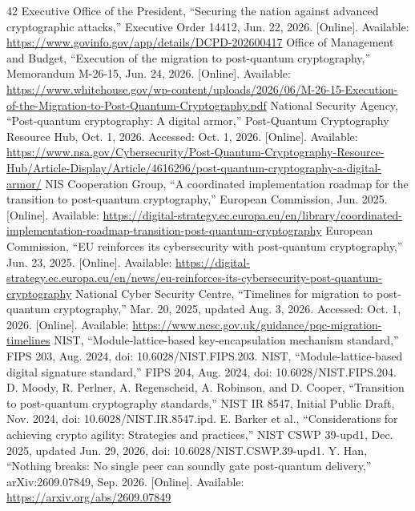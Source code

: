 \begin{thebibliography}{42}
Executive Office of the President, ``Securing the nation against advanced cryptographic attacks,'' Executive Order 14412, Jun. 22, 2026. [Online]. Available: \url{https://www.govinfo.gov/app/details/DCPD-202600417}
Office of Management and Budget, ``Execution of the migration to post-quantum cryptography,'' Memorandum M-26-15, Jun. 24, 2026. [Online]. Available: \url{https://www.whitehouse.gov/wp-content/uploads/2026/06/M-26-15-Execution-of-the-Migration-to-Post-Quantum-Cryptography.pdf}
National Security Agency, ``Post-quantum cryptography: A digital armor,'' Post-Quantum Cryptography Resource Hub, Oct. 1, 2026. Accessed: Oct. 1, 2026. [Online]. Available: \url{https://www.nsa.gov/Cybersecurity/Post-Quantum-Cryptography-Resource-Hub/Article-Display/Article/4616296/post-quantum-cryptography-a-digital-armor/}
NIS Cooperation Group, ``A coordinated implementation roadmap for the transition to post-quantum cryptography,'' European Commission, Jun. 2025. [Online]. Available: \url{https://digital-strategy.ec.europa.eu/en/library/coordinated-implementation-roadmap-transition-post-quantum-cryptography}
European Commission, ``EU reinforces its cybersecurity with post-quantum cryptography,'' Jun. 23, 2025. [Online]. Available: \url{https://digital-strategy.ec.europa.eu/en/news/eu-reinforces-its-cybersecurity-post-quantum-cryptography}
National Cyber Security Centre, ``Timelines for migration to post-quantum cryptography,'' Mar. 20, 2025, updated Aug. 3, 2026. Accessed: Oct. 1, 2026. [Online]. Available: \url{https://www.ncsc.gov.uk/guidance/pqc-migration-timelines}
NIST, ``Module-lattice-based key-encapsulation mechanism standard,'' FIPS 203, Aug. 2024, doi: 10.6028/NIST.FIPS.203.
NIST, ``Module-lattice-based digital signature standard,'' FIPS 204, Aug. 2024, doi: 10.6028/NIST.FIPS.204.
D. Moody, R. Perlner, A. Regenscheid, A. Robinson, and D. Cooper, ``Transition to post-quantum cryptography standards,'' NIST IR 8547, Initial Public Draft, Nov. 2024, doi: 10.6028/NIST.IR.8547.ipd.
E. Barker et al., ``Considerations for achieving crypto agility: Strategies and practices,'' NIST CSWP 39-upd1, Dec. 2025, updated Jun. 29, 2026, doi: 10.6028/NIST.CSWP.39-upd1.
Y. Han, ``Nothing breaks: No single peer can soundly gate post-quantum delivery,'' arXiv:2609.07849, Sep. 2026. [Online]. Available: \url{https://arxiv.org/abs/2609.07849}

\end{thebibliography}
